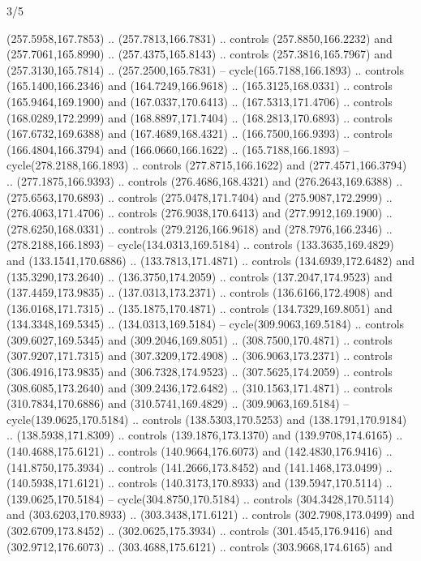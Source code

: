 \begin{flagdescription}{3/5}
\begin{scope}[scale=0.00214\flagwidth,yshift=162mm]
\begin{scope}[y=-0.8pt, x=0.8pt, inner sep=0pt, outer sep=0pt]
\begin{scope}[draw,fill=gold,line join=round,line cap=round,line width=0.0025\flagwidth]
\begin{scope}[line width=0.0025\flagwidth]
(257.5958,167.7853) .. (257.7813,166.7831) .. controls (257.8850,166.2232) and
(257.7061,165.8990) .. (257.4375,165.8143) .. controls (257.3816,165.7967) and
(257.3130,165.7814) .. (257.2500,165.7831) -- cycle(165.7188,166.1893) ..
controls (165.1400,166.2346) and (164.7249,166.9618) .. (165.3125,168.0331) ..
controls (165.9464,169.1900) and (167.0337,170.6413) .. (167.5313,171.4706) ..
controls (168.0289,172.2999) and (168.8897,171.7404) .. (168.2813,170.6893) ..
controls (167.6732,169.6388) and (167.4689,168.4321) .. (166.7500,166.9393) ..
controls (166.4804,166.3794) and (166.0660,166.1622) .. (165.7188,166.1893) --
cycle(278.2188,166.1893) .. controls (277.8715,166.1622) and
(277.4571,166.3794) .. (277.1875,166.9393) .. controls (276.4686,168.4321) and
(276.2643,169.6388) .. (275.6563,170.6893) .. controls (275.0478,171.7404) and
(275.9087,172.2999) .. (276.4063,171.4706) .. controls (276.9038,170.6413) and
(277.9912,169.1900) .. (278.6250,168.0331) .. controls (279.2126,166.9618) and
(278.7976,166.2346) .. (278.2188,166.1893) -- cycle(134.0313,169.5184) ..
controls (133.3635,169.4829) and (133.1541,170.6886) .. (133.7813,171.4871) ..
controls (134.6939,172.6482) and (135.3290,173.2640) .. (136.3750,174.2059) ..
controls (137.2047,174.9523) and (137.4459,173.9835) .. (137.0313,173.2371) ..
controls (136.6166,172.4908) and (136.0168,171.7315) .. (135.1875,170.4871) ..
controls (134.7329,169.8051) and (134.3348,169.5345) .. (134.0313,169.5184) --
cycle(309.9063,169.5184) .. controls (309.6027,169.5345) and
(309.2046,169.8051) .. (308.7500,170.4871) .. controls (307.9207,171.7315) and
(307.3209,172.4908) .. (306.9063,173.2371) .. controls (306.4916,173.9835) and
(306.7328,174.9523) .. (307.5625,174.2059) .. controls (308.6085,173.2640) and
(309.2436,172.6482) .. (310.1563,171.4871) .. controls (310.7834,170.6886) and
(310.5741,169.4829) .. (309.9063,169.5184) -- cycle(139.0625,170.5184) ..
controls (138.5303,170.5253) and (138.1791,170.9184) .. (138.5938,171.8309) ..
controls (139.1876,173.1370) and (139.9708,174.6165) .. (140.4688,175.6121) ..
controls (140.9664,176.6073) and (142.4830,176.9416) .. (141.8750,175.3934) ..
controls (141.2666,173.8452) and (141.1468,173.0499) .. (140.5938,171.6121) ..
controls (140.3173,170.8933) and (139.5947,170.5114) .. (139.0625,170.5184) --
cycle(304.8750,170.5184) .. controls (304.3428,170.5114) and
(303.6203,170.8933) .. (303.3438,171.6121) .. controls (302.7908,173.0499) and
(302.6709,173.8452) .. (302.0625,175.3934) .. controls (301.4545,176.9416) and
(302.9712,176.6073) .. (303.4688,175.6121) .. controls (303.9668,174.6165) and

\end{scope}
\end{scope}
\end{scope}
\end{scope}
\end{flagdescription}
